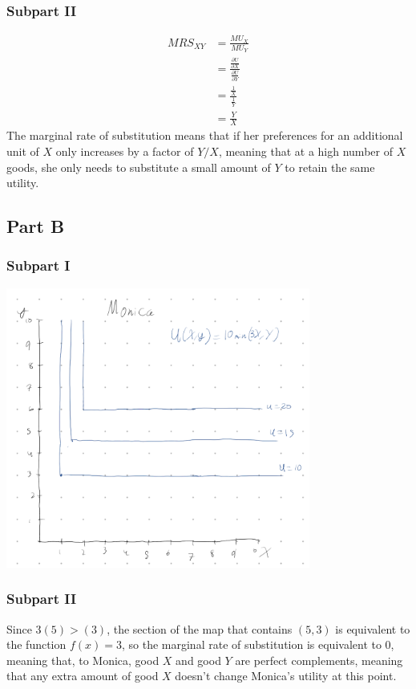 \documentclass[8pt]{extarticle}
\begin{document}
{\subsubsection*{Subpart II}
\begin{align*}
	MRS_{XY} &= \frac{MU_X}{MU_Y}\\
	&= \frac{\frac{\partial U}{\partial X}}{\frac{\partial U}{\partial Y}}\\
	&= \frac{\frac{1}{X}}{\frac{1}{Y}}\\
	&= \boxed{\frac{Y}{X}}
\end{align*}
The marginal rate of substitution means that if her preferences for an additional unit of $X$ only increases by a factor of $Y/X$, meaning that at a high number of $X$ goods, she only needs to substitute a small amount of $Y$ to retain the same utility.
\subsection*{Part B}
\subsubsection*{Subpart I}
\begin{center}
	\includegraphics[width=10cm]{HW3Q3B}
\end{center}
\subsubsection*{Subpart II}
Since $3(5) > (3)$, the section of the map that contains $(5,3)$ is equivalent to the function $f(x) = 3$, so the marginal rate of substitution is equivalent to $0$, meaning that, to Monica, good $X$ and good $Y$ are perfect complements, meaning that any extra amount of good $X$ doesn't change Monica's utility at this point.
}
\end{document}
